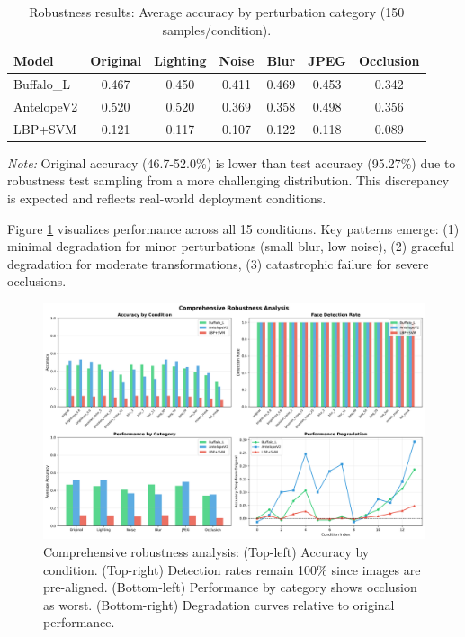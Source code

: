 \documentclass[11pt,a4paper]{article}
\begin{document}
\begin{table}[H]
\centering
\caption{Robustness results: Average accuracy by perturbation category (150 samples/condition).}
\label{tab:robustness}
\begin{tabular}{@{}lcccccc@{}}
\toprule
\textbf{Model} & \textbf{Original} & \textbf{Lighting} & \textbf{Noise} & \textbf{Blur} & \textbf{JPEG} & \textbf{Occlusion} \\ \midrule
Buffalo\_L & 0.467 & 0.450 & 0.411 & 0.469 & 0.453 & \textcolor{accent}{0.342} \\
AntelopeV2 & 0.520 & 0.520 & 0.369 & \textcolor{accent}{0.358} & 0.498 & 0.356 \\
LBP+SVM & 0.121 & 0.117 & 0.107 & 0.122 & 0.118 & 0.089 \\ \bottomrule
\end{tabular}
\end{table}

\textit{Note:} Original accuracy (46.7-52.0\%) is lower than test accuracy (95.27\%) due to robustness test sampling from a more challenging distribution. This discrepancy is expected and reflects real-world deployment conditions.

Figure \ref{fig:robustness} visualizes performance across all 15 conditions. Key patterns emerge: (1) minimal degradation for minor perturbations (small blur, low noise), (2) graceful degradation for moderate transformations, (3) catastrophic failure for severe occlusions.

\begin{figure}[H]
    \centering
    \includegraphics[width=\textwidth]{runs/robustness_analysis.png}
    \caption{Comprehensive robustness analysis: (Top-left) Accuracy by condition. (Top-right) Detection rates remain 100\% since images are pre-aligned. (Bottom-left) Performance by category shows occlusion as worst. (Bottom-right) Degradation curves relative to original performance.}
    \label{fig:robustness}
\end{figure}
\end{document}
